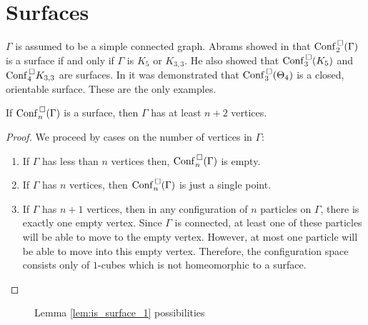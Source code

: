 \chapter{Surfaces}
\(\Gamma\) is assumed to be a simple connected graph.
Abrams showed in \cite{abrams2000configurationspaces} that \(\mathrm{Conf}^{\,\square}_2(\Gamma)\) is a surface if and only if \(\Gamma\) is \(K_5\) or \(K_{3,3}\).
He also showed that \(\mathrm{Conf}^{\,\square}_3(K_5)\) and \(\mathrm{Conf}^{\,\square}_4{K_{3,3}}\) are surfaces.
In \cite{appiah2024algebraicstructurehyperbolicgraph} it was demonstrated that \(\mathrm{Conf}^{\,\square}_3(\Theta_4)\) is a closed, orientable surface.
These are the only examples.

\begin{lem}
\label{lem:is_surface_0}
If \(\mathrm{Conf}^{\,\square}_n(\Gamma)\) is a surface, then \(\Gamma\) has at least \(n+2\) vertices.
\end{lem}
\begin{proof}
    We proceed by cases on the number of vertices in \(\Gamma\):
    \begin{enumerate}
    \item If \(\Gamma\) has less than \(n\) vertices then, \(\mathrm{Conf}^{\,\square}_n(\Gamma)\) is empty.
    \item If \(\Gamma\) has \(n\) vertices, then \(\mathrm{Conf}^{\,\square}_n(\Gamma)\) is just a single point.
    \item If \(\Gamma\) has \(n + 1\) vertices, then in any configuration of \(n\) particles on \(\Gamma\), there is 
    exactly one empty vertex. Since \(\Gamma\) is connected, at least one of these particles will be able to move to the empty vertex.
    However, at most one particle will be able to move into this empty vertex. Therefore, the configuration space
    consists only of \(1\)-cubes which is not homeomorphic to a surface.
    \end{enumerate}
\end{proof}

\begin{figure}
    \centering
    \quad\quad
    \caption{Lemma \ref{lem:is_surface_1} possibilities}
    \label{fig:lem:is_surface_1_possibilities}
\end{figure}

